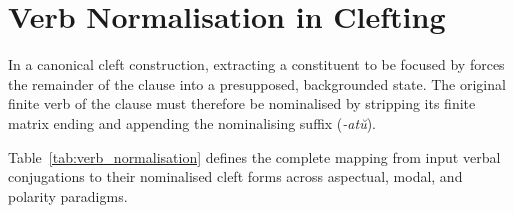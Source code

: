 
\clearpage

\section{Verb Normalisation in Clefting}

In a canonical cleft construction, extracting a constituent to be focused by  forces the remainder of the clause into a presupposed, backgrounded state. The original finite verb of the clause must therefore be nominalised by stripping its finite matrix ending and appending the nominalising suffix  (\textit{-atŭ}).

Table~\ref{tab:verb_normalisation} defines the complete mapping from input verbal conjugations to their nominalised cleft forms across aspectual, modal, and polarity paradigms.

